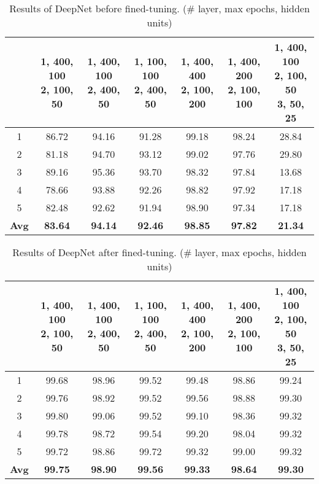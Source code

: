 \begin{table}[!htbp]
\centering
\caption{Results of DeepNet before fined-tuning. (\# layer, max epochs, hidden units)}
\label{table_sec_4_1}
\medbreak
\begin{tabular}{c|c|c|c|c|c|c}
 & \pbox{4cm}{1, 400, 100\\2, 100, 50} & \pbox{4cm}{1, 400, 100\\2, 400, 50} & \pbox{4cm}{1, 100, 100\\2, 400, 50} & \pbox{4cm}{1, 400, 400\\2, 100, 200} & \pbox{4cm}{1, 400, 200\\2, 100, 100} & \pbox{4cm}{1, 400, 100\\2, 100, 50\\3, 50, 25}\\\hline
1 & 86.72 & 94.16 & 91.28 & 99.18 & 98.24 & 28.84\\\hline
2 & 81.18 & 94.70 & 93.12 & 99.02 & 97.76 & 29.80\\\hline
3 & 89.16 & 95.36 & 93.70 & 98.32 & 97.84 & 13.68\\\hline
4 & 78.66 & 93.88 & 92.26 & 98.82 & 97.92 & 17.18\\\hline
5 & 82.48 & 92.62 & 91.94 & 98.90 & 97.34 & 17.18\\\hline
\textbf{Avg} & \textbf{83.64} & \textbf{94.14} & \textbf{92.46} & \textbf{98.85} & \textbf{97.82} & \textbf{21.34} 
\end{tabular}
\end{table}


\begin{table}[!htbp]
\centering
\caption{Results of DeepNet after fined-tuning. (\# layer, max epochs, hidden units)}
\label{table_sec_4_2}
\medbreak
\begin{tabular}{c|c|c|c|c|c|c}
 & \pbox{4cm}{1, 400, 100\\2, 100, 50} & \pbox{4cm}{1, 400, 100\\2, 400, 50} & \pbox{4cm}{1, 100, 100\\2, 400, 50} & \pbox{4cm}{1, 400, 400\\2, 100, 200} & \pbox{4cm}{1, 400, 200\\2, 100, 100} & \pbox{4cm}{1, 400, 100\\2, 100, 50\\3, 50, 25}\\\hline
1 & 99.68 & 98.96 & 99.52 & 99.48  &98.86 & 99.24\\\hline
2 & 99.76 & 98.92& 99.52 & 99.56 & 98.88 & 99.30\\\hline
3 & 99.80 & 99.06& 99.52 & 99.10 & 98.36 & 99.32\\\hline
4 & 99.78 & 98.72& 99.54 & 99.20 & 98.04 & 99.32 \\\hline
5 & 99.72 & 98.86 & 99.72 & 99.32 & 99.00 & 99.32\\\hline
\textbf{Avg} & \textbf{99.75} & \textbf{98.90} & \textbf{99.56} & \textbf{99.33} & \textbf{98.64} & \textbf{99.30} 
\end{tabular}
\end{table}


